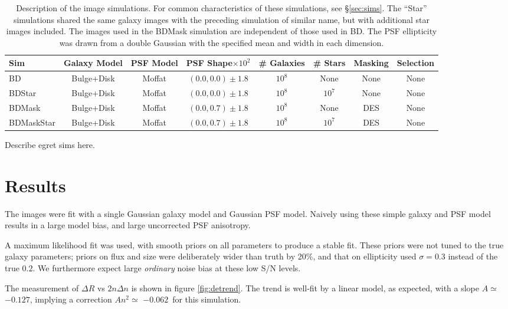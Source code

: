 \documentclass[usegraphicx,usenatbib]{mn2e}
\newcommand{\Aslope}{$-0.127$}
\newcommand{\Rcorr}{$-0.062$}
\newcommand{\nsimNgal}{$10^8$}
\newcommand{\nsimNstar}{$10^7$}
\newcommand{\psfdist}{$(0.0,0.7) \pm 1.8$}
\newcommand{\rpsfdist}{$(0.0,0.0) \pm 1.8$}
\begin{document}
\begin{table}
    \centering
    \caption{Description of the image simulations. For common characteristics of these simulations,
        see \S \ref{sec:sims}.  The ``Star''
    simulations shared the same galaxy images with the preceding simulation of similar name, but with additional star
images included. The images used in the BDMask simulation are
independent of those used in BD.   The PSF ellipticity was drawn from a 
double Gaussian with the specified mean and width in each dimension.  \label{tab:sims}}
    \begin{tabular}{ | l | c | c | c | c | c | c | c |}
        Sim        & Galaxy Model & PSF Model & PSF Shape$\times 10^2$ & \# Galaxies & \# Stars    & Masking & Selection  \\
        \hline
        BD         & Bulge+Disk   & Moffat    & \rpsfdist     &  \nsimNgal   & None        & None    & None  \\
        BDStar     & Bulge+Disk   & Moffat    & \rpsfdist     &  \nsimNgal   & \nsimNstar  & None    & None  \\
        BDMask     & Bulge+Disk   & Moffat    & \psfdist  &  \nsimNgal   & None        & DES     & None  \\
        BDMaskStar & Bulge+Disk   & Moffat    & \psfdist  &  \nsimNgal   & \nsimNstar  & DES     & None  \\
    \end{tabular}
\end{table}

Describe egret sims here.


\section{Results} \label{sec:detrendsim}

The images were fit with a single Gaussian galaxy model and Gaussian PSF model.
Naively using these simple galaxy and PSF model results in a large model bias,
and large uncorrected PSF anisotropy.

A maximum likelihood fit was used, with smooth priors on all parameters to
produce a stable fit.  These priors were not tuned to the true galaxy
parameters; priors on flux and size were deliberately wider than truth by 20\%,
and that on ellipticity used $\sigma=0.3$ instead of the true $0.2$.  We
furthermore expect large {\em ordinary} noise bias at these low S/N levels.


The measurement of $\Delta R$ vs $2 n \Delta n$ is shown in figure
\ref{fig:detrend}.  The trend is well-fit by a linear model, as expected, with
a slope $A \simeq $\Aslope, implying a correction $A n^2 \simeq$ \Rcorr\ for this
simulation.
\end{document}

